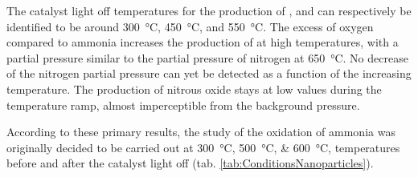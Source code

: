 The catalyst light off temperatures for the production of ,  and  can respectively be identified to be around \qty{300}{\degreeCelsius}, \qty{450}{\degreeCelsius}, and \qty{550}{\degreeCelsius}.
The excess of oxygen compared to ammonia increases the production of  at high temperatures, with a partial pressure similar to the partial pressure of nitrogen at \qty{650}{\degreeCelsius}.
No decrease of the nitrogen partial pressure can yet be detected as a function of the increasing temperature.
The production of nitrous oxide stays at low values during the temperature ramp, almost imperceptible from the background pressure.

According to these primary results, the study of the oxidation of ammonia was originally decided to be carried out at \qtylist{300;500;600}{\degreeCelsius}, temperatures before and after the catalyst light off (tab. \ref{tab:ConditionsNanoparticles}).

\begin{table}[!htb]
\centering
{}
\caption{Different atmospheres used to probe the ammonia oxidation on Pt nanoparticles with BCDI.}
\label{tab:ConditionsNanoparticles}
\end{table}
